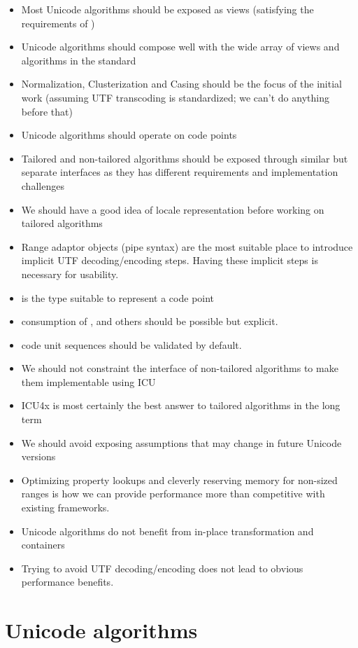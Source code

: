 \documentclass{wg21}
\begin{document}
\begin{itemize}
\item Most Unicode algorithms should be exposed as views (satisfying the requirements of )
\item Unicode algorithms should compose well with the wide array of views and algorithms in the standard
\item Normalization, Clusterization and Casing should be the focus of the initial work (assuming UTF transcoding is standardized; we can't do anything before that)
\item Unicode algorithms should operate on code points
\item Tailored and non-tailored algorithms should be exposed through similar but separate interfaces as they has different requirements and implementation challenges
\item We should have a good idea of locale representation before working on tailored algorithms
\item Range adaptor objects (pipe syntax) are the most suitable place to introduce implicit UTF decoding/encoding steps. Having these implicit steps is necessary for usability.
\item {} is the type suitable to represent a code point
\item consumption of ,  and others should be possible but explicit.
\item code unit sequences should be validated by default.
\item We should not constraint the interface of non-tailored algorithms to make them implementable using ICU
\item ICU4x is most certainly the best answer to tailored algorithms in the long term
\item We should avoid exposing assumptions that may change in future Unicode versions
\item Optimizing property lookups and cleverly reserving memory for non-sized ranges is how we can provide performance more than competitive with existing frameworks.
\item Unicode algorithms do not benefit from in-place transformation and containers
\item Trying to avoid UTF decoding/encoding does not lead to obvious performance benefits.
\end{itemize}

\section{Unicode algorithms}
\end{document}
